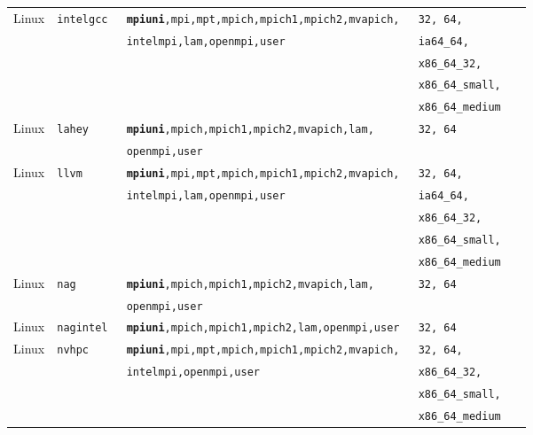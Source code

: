 \begin{longtable}{lllll}
Linux   &\tt intelgcc             &\footnotesize \tt {\bf mpiuni},mpi,mpt,mpich,mpich1,mpich2,mvapich, &\tt 32, 64, \\
        &                         &\footnotesize \tt intelmpi,lam,openmpi,user                          &\tt ia64\_64, \\
        &                         &                              &\tt x86\_64\_32, \\
        &                         &                              &\tt x86\_64\_small, \\
        &                         &                              &\tt x86\_64\_medium \\
Linux   &\tt lahey                &\footnotesize \tt {\bf mpiuni},mpich,mpich1,mpich2,mvapich,lam, &\tt 32, 64 \\
        &                         &\footnotesize \tt openmpi,user &  \\
Linux   &\tt llvm                 &\footnotesize \tt {\bf mpiuni},mpi,mpt,mpich,mpich1,mpich2,mvapich, &\tt 32, 64, \\
        &                         &\footnotesize \tt intelmpi,lam,openmpi,user                          &\tt ia64\_64, \\
        &                         &                              &\tt x86\_64\_32, \\
        &                         &                              &\tt x86\_64\_small, \\
        &                         &                              &\tt x86\_64\_medium \\
Linux   &\tt nag                  &\footnotesize \tt {\bf mpiuni},mpich,mpich1,mpich2,mvapich,lam, &\tt 32, 64 \\
        &                         &\footnotesize \tt openmpi,user &  \\
Linux   &\tt nagintel             &\footnotesize \tt {\bf mpiuni},mpich,mpich1,mpich2,lam,openmpi,user &\tt 32, 64 \\
Linux   &\tt nvhpc                &\footnotesize \tt {\bf mpiuni},mpi,mpt,mpich,mpich1,mpich2,mvapich, &\tt 32, 64, \\
        &                         &\footnotesize \tt intelmpi,openmpi,user &\tt x86\_64\_32, \\
        &                         &                              &\tt x86\_64\_small, \\
        &                         &                              &\tt x86\_64\_medium \\

\end{longtable}
